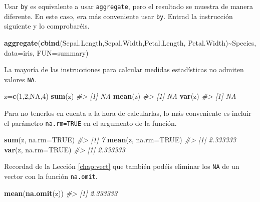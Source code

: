 \documentclass[
]{book}
\newenvironment{Shaded}{\begin{snugshade}}{\end{snugshade}}
\newcommand{\CommentTok}[1]{\textcolor[rgb]{0.56,0.35,0.01}{\textit{#1}}}
\newcommand{\DataTypeTok}[1]{\textcolor[rgb]{0.13,0.29,0.53}{#1}}
\newcommand{\DecValTok}[1]{\textcolor[rgb]{0.00,0.00,0.81}{#1}}
\newcommand{\KeywordTok}[1]{\textcolor[rgb]{0.13,0.29,0.53}{\textbf{#1}}}
\newcommand{\NormalTok}[1]{#1}
\newcommand{\OperatorTok}[1]{\textcolor[rgb]{0.81,0.36,0.00}{\textbf{#1}}}
\newcommand{\OtherTok}[1]{\textcolor[rgb]{0.56,0.35,0.01}{#1}}
\theoremstyle{definition}
\theoremstyle{definition}
\theoremstyle{definition}
\theoremstyle{remark}
\begin{document}
Usar \texttt{by} es equivalente a usar \texttt{aggregate}, pero el resultado se muestra de manera diferente. En este caso, era más conveniente usar \texttt{by}. Entrad la instrucción siguiente y lo comprobaréis.

\begin{Shaded}
\begin{Highlighting}[]
\KeywordTok{aggregate}\NormalTok{(}\KeywordTok{cbind}\NormalTok{(Sepal.Length,Sepal.Width,Petal.Length, Petal.Width)}\OperatorTok{\textasciitilde{}}\NormalTok{Species, }\DataTypeTok{data=}\NormalTok{iris, }\DataTypeTok{FUN=}\NormalTok{summary)}
\end{Highlighting}
\end{Shaded}

La mayoría de las instrucciones para calcular medidas estadísticas no admiten valores \texttt{NA}.

\begin{Shaded}
\begin{Highlighting}[]
\NormalTok{z=}\KeywordTok{c}\NormalTok{(}\DecValTok{1}\NormalTok{,}\DecValTok{2}\NormalTok{,}\OtherTok{NA}\NormalTok{,}\DecValTok{4}\NormalTok{)}
\KeywordTok{sum}\NormalTok{(z)}
\CommentTok{\#\textgreater{} [1] NA}
\KeywordTok{mean}\NormalTok{(z)}
\CommentTok{\#\textgreater{} [1] NA}
\KeywordTok{var}\NormalTok{(z)}
\CommentTok{\#\textgreater{} [1] NA}
\end{Highlighting}
\end{Shaded}

Para no tenerlos en cuenta a la hora de calcularlas, lo más conveniente es incluir el parámetro \texttt{na.rm=TRUE} en el argumento de la función.

\begin{Shaded}
\begin{Highlighting}[]
\KeywordTok{sum}\NormalTok{(z, }\DataTypeTok{na.rm=}\OtherTok{TRUE}\NormalTok{)}
\CommentTok{\#\textgreater{} [1] 7}
\KeywordTok{mean}\NormalTok{(z, }\DataTypeTok{na.rm=}\OtherTok{TRUE}\NormalTok{)}
\CommentTok{\#\textgreater{} [1] 2.333333}
\KeywordTok{var}\NormalTok{(z, }\DataTypeTok{na.rm=}\OtherTok{TRUE}\NormalTok{)}
\CommentTok{\#\textgreater{} [1] 2.333333}
\end{Highlighting}
\end{Shaded}

Recordad de la Lección \ref{chap:vect} que también podéis eliminar los \texttt{NA} de un vector con la función \texttt{na.omit}.

\begin{Shaded}
\begin{Highlighting}[]
\KeywordTok{mean}\NormalTok{(}\KeywordTok{na.omit}\NormalTok{(z))}
\CommentTok{\#\textgreater{} [1] 2.333333}
\end{Highlighting}
\end{Shaded}
\end{document}
